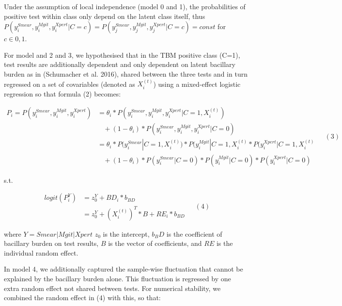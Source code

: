 \documentclass[
]{article}
\begin{document}
Under the assumption of local independence (model 0 and 1), the probabilities of positive test within class only depend on the latent class itself, thus \(P(y^{Smear}_i, y^{Mgit}_i, y^{Xpert}_i|C = c) = P(y^{Smear}_j, y^{Mgit}_j, y^{Xpert}_j|C = c) = const\) for \(c \in {0, 1}\).

For model and 2 and 3, we hypothesised that in the TBM positive class (C=1), test results are additionally dependent and only dependent on latent bacillary burden as in (Schumacher et al. 2016), shared between the three tests and in turn regressed on a set of covariables (denoted as \(X^{(t)}_i\)) using a mixed-effect logistic regression so that formula (2) becomes:

\[
\begin{aligned}
P_i = P(y^{Smear}_i,y^{Mgit}_i,y^{Xpert}_i) &= \theta_i * P(y^{Smear}_i,y^{Mgit}_i,y^{Xpert}_i|C=1, X^{(t)}_i)\\ 
&\ \ \ \ + (1-\theta_i) * P(y^{Smear}_i,y^{Mgit}_i,y^{Xpert}_i|C=0) \\
&= \theta_i * P(y^{Smear}_i | C=1,X^{(t)}_i) * P(y^{Mgit}_i | C=1,X^{(t)}_i * P(y^{Xpert}_i | C=1, X^{(t)}_i \\
&\ \ \ \ + (1-\theta_i) *  P(y^{Smear}_i | C=0) * P(y^{Mgit}_i | C=0) * P(y^{Xpert}_i | C=0)
\end{aligned} 
\;\;\;\;(
3
)
\]

s.t.

\[
\begin{aligned}
logit(P^Y_i) &= z^Y_0 + BD_i * b_{BD} \\
&= z^Y_0 + (X^{(t)}_i)^T * B + RE_i * b_{BD}
\end{aligned} 
\;\;\;\;(
4
)
\]

where \(Y=Smear|Mgit|Xpert\) \(z_0\) is the intercept, \(b_BD\) is the coefficient of bacillary burden on test results, \(B\) is the vector of coefficients, and \(RE\) is the individual random effect.

In model 4, we additionally captured the sample-wise fluctuation that cannot be explained by the bacillary burden alone. This fluctuation is regressed by one extra random effect not shared between tests. For numerical stability, we combined the random effect in (4) with this, so that:
\end{document}
